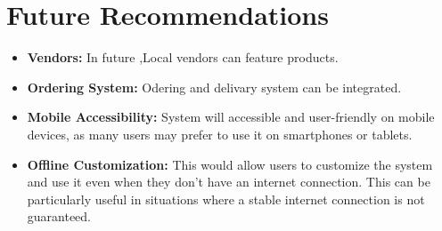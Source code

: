 \section{Future Recommendations}
\begin{itemize}
    \item \textbf{Vendors:} In future ,Local vendors can feature products.
    \item \textbf{Ordering System:} Odering and delivary system can be integrated.
    \item \textbf{Mobile Accessibility:} System will accessible and user-friendly on mobile devices, as many users may prefer to use it on smartphones or tablets.
    \item \textbf{Offline Customization:} This would allow users to customize the system and use it even when they don't have an internet connection. This can be particularly useful in situations where a stable internet connection is not guaranteed.
\end{itemize}